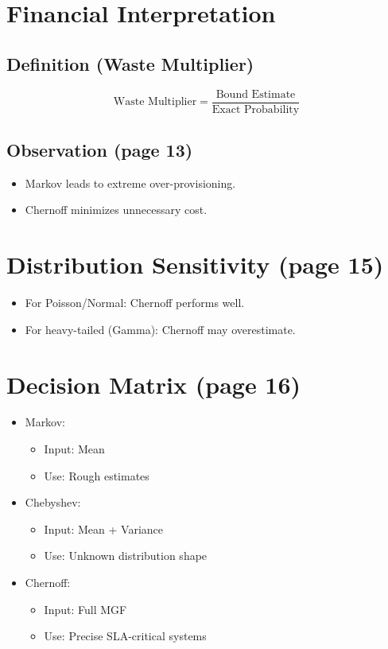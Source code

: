 \documentclass[12pt]{article}
\begin{document}
\section*{Financial Interpretation}

\subsection*{Definition (Waste Multiplier)}
\[
\text{Waste Multiplier} = \frac{\text{Bound Estimate}}{\text{Exact Probability}}
\]

\subsection*{Observation (page 13)}
\begin{itemize}
    \item Markov leads to extreme over-provisioning.
    \item Chernoff minimizes unnecessary cost.
\end{itemize}

\section*{Distribution Sensitivity (page 15)}

\begin{itemize}
    \item For Poisson/Normal: Chernoff performs well.
    \item For heavy-tailed (Gamma): Chernoff may overestimate.
\end{itemize}

\section*{Decision Matrix (page 16)}

\begin{itemize}
    \item Markov:
    \begin{itemize}
        \item Input: Mean
        \item Use: Rough estimates
    \end{itemize}
    \item Chebyshev:
    \begin{itemize}
        \item Input: Mean + Variance
        \item Use: Unknown distribution shape
    \end{itemize}
    \item Chernoff:
    \begin{itemize}
        \item Input: Full MGF
        \item Use: Precise SLA-critical systems
    \end{itemize}
\end{itemize}
\end{document}
